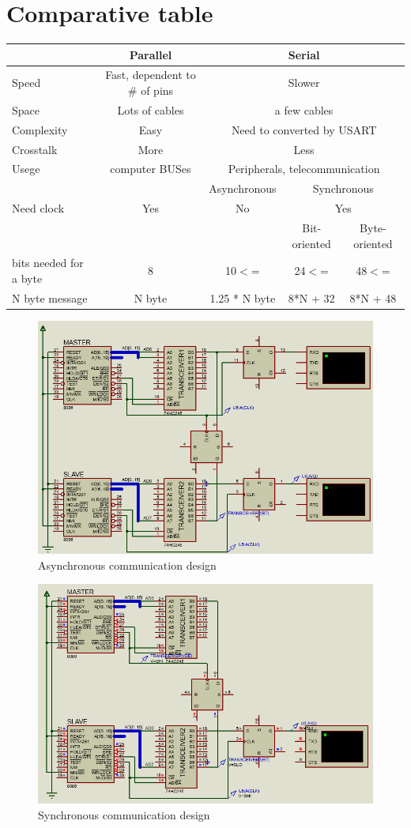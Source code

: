 \documentclass[11pt]{article}
\begin{document}
\section{Comparative table}
\begin{tabular}{|l|c|c|c|c|}
\hline
 & Parallel & \multicolumn{3}{c|}{Serial}\\
\hline
Speed & Fast, dependent to \# of pins & \multicolumn{3}{c|}{Slower}\\
\hline
Space & Lots of cables & \multicolumn{3}{c|}{a few cables}\\
\hline
Complexity & Easy & \multicolumn{3}{c|}{Need to converted by USART}\\
\hline
Crosstalk & More & \multicolumn{3}{c|}{Less}\\
\hline
Usege & computer BUSes & \multicolumn{3}{c|}{Peripherals, telecommunication}\\
\hline
&  & Asynchronous & \multicolumn{2}{c|}{Synchronous}\\
\hline
Need clock & Yes & No & \multicolumn{2}{c|}{Yes}\\
\hline
 & & & Bit-oriented & Byte-oriented \\
\hline
bits needed for a byte & 8 & 10$<$= & 24$<$= & 48$<$= \\
\hline
N byte message & N byte & 1.25 * N byte & 8*N + 32 & 8*N + 48 \\
\hline
\end{tabular}
\newpage
\begin{figure}[h!]
	\centering
	\includegraphics[width=12cm]{Asenkron.png}
	\caption{Asynchronous communication design}
	\label{asenkron}
\end{figure}

\begin{figure}[h!]
	\centering
	\includegraphics[width=12cm]{Senkron.png}
	\caption{Synchronous communication design}
	\label{senkron}
\end{figure}
\end{document}
